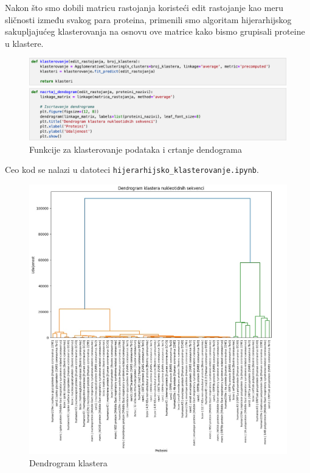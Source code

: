 \documentclass[a4paper,12pt]{article}
\begin{document}
\bigskip
Nakon što smo dobili matricu rastojanja koristeći edit rastojanje kao meru sličnosti između svakog para proteina, primenili smo algoritam hijerarhijskog sakupljajućeg klasterovanja na osnovu ove matrice kako bismo grupisali proteine u klastere. 

\bigskip
\begin{figure}[h!]
  \centering
  \includegraphics[width=1.0\textwidth]{slika20.jpeg}
  \caption{Funkcije za klasterovanje podataka i crtanje dendograma}
  \label{fig:my_label}
\end{figure}

\bigskip
Ceo kod se nalazi u datoteci \texttt{hijerarhijsko\_klasterovanje.ipynb}.

\newpage
\begin{figure}[h!]
  \hspace*{-1.3cm}
  \centering
  \includegraphics[width=1.2\textwidth]{slika21.jpeg}
  \caption{Dendrogram klastera}
  \label{fig:my_label}
\end{figure}
\end{document}
